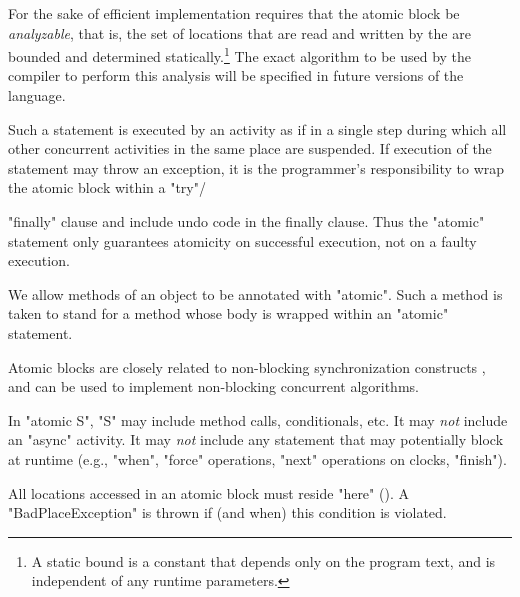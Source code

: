For the sake of efficient implementation \XtenCurrVer{} requires
that the atomic block be {\em analyzable}, that is, the set of
locations that are read and written by the  are
bounded and determined statically.\footnote{A static bound is a constant
that depends only on the program text, and is independent 
of any runtime parameters. }
The exact algorithm to be used by
the compiler to perform this analysis will be specified in future
versions of the language.
\tbd{}

Such a statement is executed by an activity as if in a single step
during which all other concurrent activities in the same place are
suspended. If execution of the statement may throw an exception, it is
the programmer's responsibility to wrap the atomic block within a
\xcd"try"/{\xcd"finally" clause and include undo code in the finally
clause. Thus the \xcd"atomic" statement only guarantees atomicity on
successful execution, not on a faulty execution.

We allow methods of an object to be annotated with \xcd"atomic". Such
a method is taken to stand for a method whose body is wrapped within an
\xcd"atomic" statement.

Atomic blocks are closely related to non-blocking synchronization
constructs \cite{herlihy91waitfree}, and can be used to implement 
non-blocking concurrent algorithms.

\begin{staticrule*}
In \xcd"atomic S", \xcd"S" may include method calls,
conditionals, etc.
It may {\em not} include an \xcd"async" activity.
It may {\em not} include any statement that may potentially block at
runtime (e.g., \xcd"when", \xcd"force" operations, \xcd"next"
operations on clocks, \xcd"finish").

\end{staticrule*}


All locations accessed in an atomic block must reside \xcd"here"
(). A
\xcd"BadPlaceException" is thrown
if (and when) this condition is violated.

}
